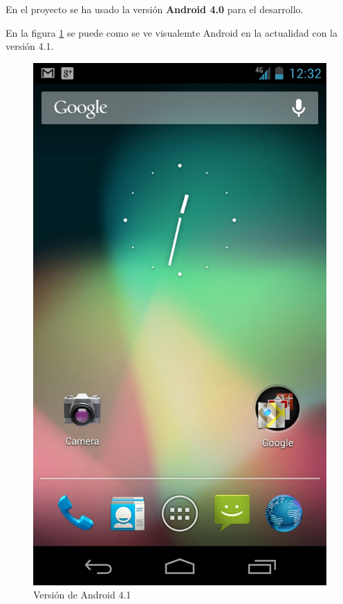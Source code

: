 En el proyecto se ha usado la versión \textbf{Android 4.0} para el desarrollo.

En la figura \ref{fig:Android41} se puede como se ve visualemte Android en la actualidad con la versión 4.1.

\begin{figure}
  \centering
    \includegraphics[scale=0.2]{./ConocimientosPrevios/imagenes/android41.jpeg}
  \caption{Versión de Android 4.1}
  \label{fig:Android41}
\end{figure}


